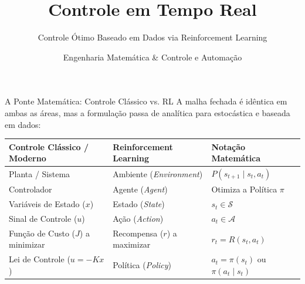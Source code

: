 \documentclass[11pt, aspectratio=169]{beamer}
\title{Controle em Tempo Real}
\subtitle{Controle Ótimo Baseado em Dados via Reinforcement Learning}
\author{Engenharia Matemática \& Controle e Automação}
\date{}
\begin{document}
\begin{frame}
    \titlepage
\end{frame}

\begin{frame}{A Ponte Matemática: Controle Clássico vs. RL}
    A malha fechada é idêntica em ambas as áreas, mas a formulação passa de analítica para estocástica e baseada em dados:
    
    \vspace{0.3cm}
    \begin{table}
        \centering
        \small
        \renewcommand{\arraystretch}{1.25}
        \begin{tabular}{lll}
            \toprule
            \textbf{Controle Clássico / Moderno} & \textbf{Reinforcement Learning} & \textbf{Notação Matemática} \\
            \midrule
            Planta / Sistema & Ambiente (\textit{Environment}) & $P(s_{t+1} \mid s_t, a_t)$ \\
            Controlador & Agente (\textit{Agent}) & Otimiza a Política $\pi$ \\
            Variáveis de Estado ($x$) & Estado (\textit{State}) & $s_t \in \mathcal{S}$ \\
            Sinal de Controle ($u$) & Ação (\textit{Action}) & $a_t \in \mathcal{A}$ \\
            Função de Custo ($J$) a minimizar & Recompensa ($r$) a maximizar & $r_t = R(s_t, a_t)$ \\
            Lei de Controle ($u = -Kx$) & Política (\textit{Policy}) & $a_t = \pi(s_t)$ ou $\pi(a_t \mid s_t)$ \\
            \bottomrule
        \end{tabular}
    \end{table}
\end{frame}
\end{document}
